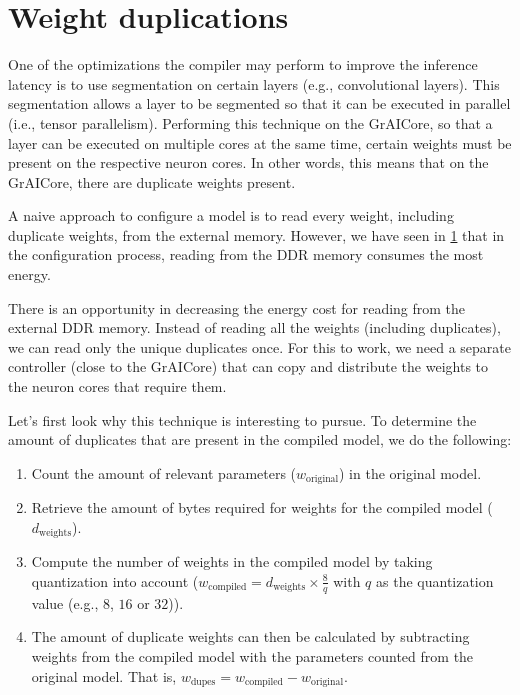 \section{Weight duplications}
One of the optimizations the compiler may perform to improve the inference latency is to use segmentation on certain layers (e.g., convolutional layers).
This segmentation allows a layer to be segmented so that it can be executed in parallel (i.e., tensor parallelism).
Performing this technique on the GrAICore, so that a layer can be executed on multiple cores at the same time, certain weights must be present on the respective neuron cores.
In other words, this means that on the GrAICore, there are duplicate weights present.

A naive approach to configure a model is to read every weight, including duplicate weights, from the external memory.
However, we have seen in \ref{} that in the configuration process, reading from the DDR memory consumes the most energy.

There is an opportunity in decreasing the energy cost for reading from the external DDR memory.
Instead of reading all the weights (including duplicates), we can read only the unique duplicates once.
For this to work, we need a separate controller (close to the GrAICore) that can copy and distribute the weights to the neuron cores that require them.

Let's first look why this technique is interesting to pursue.
To determine the amount of duplicates that are present in the compiled model, we do the following:
\begin{enumerate}
    \item
    Count the amount of relevant parameters ($w_
    \textrm{original}$) in the original model.
    \item
    Retrieve the amount of bytes required for weights for the compiled model ($d_\textrm{weights}$).
    \item
    Compute the number of weights in the compiled model by taking quantization into account ($w_\textrm{compiled} = d_\textrm{weights} \times \frac{8}{q}$ with $q$ as the quantization value (e.g., $8$, $16$ or $32$)).
    \item  
    The amount of duplicate weights can then be calculated by subtracting weights from the compiled model with the parameters counted from the original model. That is, $w_\textrm{dupes} = w_\textrm{compiled} - w_\textrm{original}$.
\end{enumerate}

